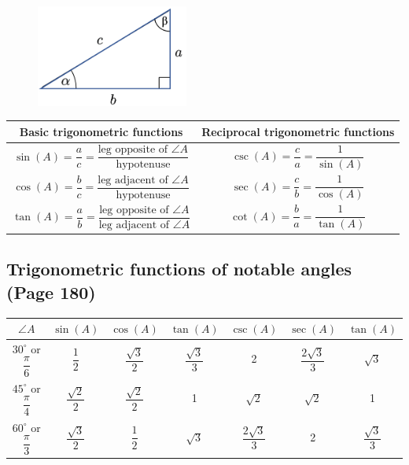 \begin{figure}[H]
    \centering
    \includegraphics[width=5cm]{images/triangle}
\end{figure}
    \renewcommand{\arraystretch}{2.6}
    \begin{table}[H]
        \centering
        \begin{tabular}{|c|c|}
            \hline
            Basic trigonometric functions & Reciprocal trigonometric functions\\
            \hline \hline
            $\sin(A) = \dfrac{a}{c} = \dfrac{\text{leg opposite of }\angle A}{\text{hypotenuse}}$ & $\csc(A) = \dfrac{c}{a} = \dfrac{1}{\sin(A)}$ \\\hline
            $\cos(A) = \dfrac{b}{c} = \dfrac{\text{leg adjacent of }\angle A}{\text{hypotenuse}}$ & $\sec(A) = \dfrac{c}{b} = \dfrac{1}{\cos(A)}$ \\\hline
            $\tan(A) = \dfrac{a}{b} = \dfrac{\text{leg opposite of }\angle A}{\text{leg adjacent of }\angle A}$ & $\cot(A) = \dfrac{b}{a} = \dfrac{1}{\tan(A)}$ \\\hline
        \end{tabular}\label{tab:table}
    \end{table}



\subsection{Trigonometric functions of notable angles (Page 180)}

\begin{table}[H]
    \centering
    \begin{tabular}{|c|c|c|c|c|c|c|}
        \hline
        $\angle A$ & $\sin(A)$ & $\cos(A)$ & $\tan(A)$ & $\csc(A)$ & $\sec(A)$ & $\tan(A)$\\
        \hline \hline
        $30^\circ$ or $\dfrac{\pi}{6}$ & $\dfrac{1}{2}$ & $\dfrac{\sqrt{3}}{2}$ & $\dfrac{\sqrt{3}}{3}$ & 2 & $\dfrac{2\sqrt{3}}{3}$ & $\sqrt{3}$\\ \hline
        $45^\circ$ or $\dfrac{\pi}{4}$ & $\dfrac{\sqrt{2}}{2}$ & $\dfrac{\sqrt{2}}{2}$ & 1 & $\sqrt{2}$ & $\sqrt{2}$ & 1\\ \hline
        $60^\circ$ or $\dfrac{\pi}{3}$ & $\dfrac{\sqrt{3}}{2}$ & $\dfrac{1}{2}$ & $\sqrt{3}$ & $\dfrac{2\sqrt{3}}{3}$ & 2 & $\dfrac{\sqrt{3}}{3}$\\ \hline
    \end{tabular}\label{tab:table1}
\end{table}



